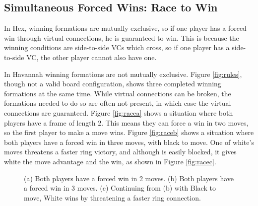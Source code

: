 \subsection{Simultaneous Forced Wins: Race to Win}

In Hex, winning formations are mutually exclusive, so if one player has a forced win through virtual connections, he is guaranteed to win. This is because the winning conditions are side-to-side VCs which cross, so if one player has a side-to-side VC, the other player cannot also have one.

In Havannah winning formations are not mutually exclusive. Figure \ref{fig:rules}, though not a valid board configuration, shows three completed winning formations at the same time. While virtual connections can be broken, the formations needed to do so are often not present, in which case the virtual connections are guaranteed. Figure \ref{fig:racea} shows a situation where both players have a frame of length 2. This means they can force a win in two moves, so the first player to make a move wins. Figure \ref{fig:raceb} shows a situation where both players have a forced win in three moves, with black to move. One of white's moves threatens a faster ring victory, and although is easily blocked, it gives white the move advantage and the win, as shown in Figure \ref{fig:racec}.


\begin{figure}
	\centering
	\caption[Simultaneous Forced Wins: Race to Win]{(a) Both players have a forced win in 2 moves. (b) Both players have a forced win in 3 moves. (c) Continuing from (b) with Black to move, White wins
by threatening a faster ring connection.}
	\label{fig:race}
\end{figure}


